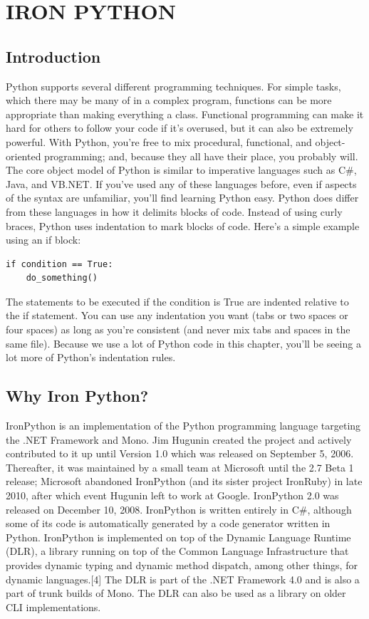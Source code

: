\documentclass[12pt,a4paper,final,twoside,titlepage]{book}
\begin{document}
\chapter{IRON PYTHON}
\section{Introduction}
Python supports several different programming techniques. For simple tasks, which there may be many of in a complex program, functions can be more appropriate than making everything a class. Functional programming can make it hard for others to follow your code if it’s overused, but it can also be extremely powerful. With Python, you’re free to mix procedural, functional, and object-oriented programming; and, because they all have their place, you probably will. The core object model of Python is similar to imperative languages such as C\#, Java, and VB.NET. If you’ve used any of these languages before, even if aspects of the syntax are unfamiliar, you’ll find learning Python easy. Python does differ from these languages in how it delimits blocks of code. Instead of using curly braces, Python uses indentation to mark blocks of code. Here’s a simple example using an if block:
\lstset{language=python, tabsize=4}
\begin{lstlisting}
if condition == True:
	do_something()
\end{lstlisting}
The statements to be executed if the condition is True are indented relative to the if statement. You can use any indentation you want (tabs or two spaces or four spaces) as long as you’re consistent (and never mix tabs and spaces in the same file). Because we use a lot of Python code in this chapter, you’ll be seeing a lot more of Python’s indentation rules.

\section{Why Iron Python?}
IronPython is an implementation of the Python programming language targeting the .NET Framework and Mono. Jim Hugunin created the project and actively contributed to it up until Version 1.0 which was released on September 5, 2006. Thereafter, it was maintained by a small team at Microsoft until the 2.7 Beta 1 release; Microsoft abandoned IronPython (and its sister project IronRuby) in late 2010, after which event Hugunin left to work at Google. IronPython 2.0 was released on December 10, 2008. IronPython is written entirely in C\#, although some of its code is automatically generated by a code generator written in Python. IronPython is implemented on top of the Dynamic Language Runtime (DLR), a library running on top of the Common Language Infrastructure that provides dynamic typing and dynamic method dispatch, among other things, for dynamic languages.[4] The DLR is part of the .NET Framework 4.0 and is also a part of trunk builds of Mono. The DLR can also be used as a library on older CLI implementations.
\end{document}
